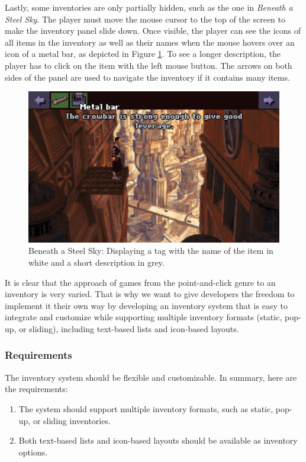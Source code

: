 Lastly, some inventories are only partially hidden, such as the one in \textit{Beneath a Steel Sky}. The player must move the mouse cursor to the top of the screen to make the inventory panel slide down. Once visible, the player can see the icons of all items in the inventory as well as their names when the mouse hovers over an icon of a metal bar, as depicted in Figure \ref{fig:I-BaSS2}. To see a longer description, the player has to click on the item with the left mouse button. The arrows on both sides of the panel are used to navigate the inventory if it contains many items.

\begin{figure}[H]
\centering
\includegraphics[width=.8\linewidth]{img/I-BaSS2.png}
\caption{Beneath a Steel Sky: Displaying a tag with the name of the item in white and a short description in grey.}
\label{fig:I-BaSS2}
\end{figure}

It is clear that the approach of games from the point-and-click genre to an inventory is very varied. That is why we want to give developers the freedom to implement it their own way by developing an inventory system that is easy to integrate and customize while supporting multiple inventory formats (static, pop-up, or sliding), including text-based lists and icon-based layouts. 

\subsubsection{Requirements}
The inventory system should be flexible and customizable. In summary, here are the requirements:

\begin{enumerate}[label=\color{teal}\textbf{R{\arabic*}},resume]
  \item \label{intro:req:inv_formats} The system should support multiple inventory formats, such as static, pop-up, or sliding inventories.
  \item \label{intro:req:text_icon} Both text-based lists and icon-based layouts should be available as inventory options.
\end{enumerate}

